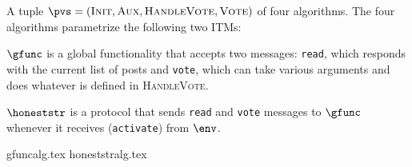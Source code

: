 \begin{definition}
  \label{model:def:pvs}
  A tuple $\pvs = \left(\textsc{Init}, \textsc{Aux}, \textsc{HandleVote},
  \textsc{Vote}\right)$ of four algorithms. The four algorithms parametrize the
  following two ITMs:

  $\gfunc$ is a global functionality that accepts two messages: \texttt{read},
  which responds with the current list of posts and \texttt{vote}, which can
  take various arguments and does whatever is defined in \textsc{HandleVote}.

  $\honeststr$ is a protocol that sends \texttt{read} and \texttt{vote}
  messages to $\gfunc$ whenever it receives (\texttt{activate}) from $\env$.
\end{definition}
{gfuncalg.tex}
{honeststralg.tex}
